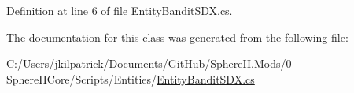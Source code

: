 Definition at line 6 of file Entity\+Bandit\+S\+D\+X.\+cs.



The documentation for this class was generated from the following file\+:\begin{DoxyCompactItemize}
\item 
C\+:/\+Users/jkilpatrick/\+Documents/\+Git\+Hub/\+Sphere\+I\+I.\+Mods/0-\/\+Sphere\+I\+I\+Core/\+Scripts/\+Entities/\mbox{\hyperlink{_entity_bandit_s_d_x_8cs}{Entity\+Bandit\+S\+D\+X.\+cs}}\end{DoxyCompactItemize}

